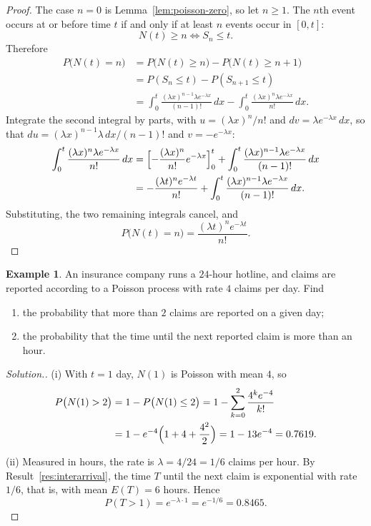 \documentclass[11pt,a4paper]{article}
\theoremstyle{definition}
\newtheorem{exa}[thm]{Example}
\newenvironment{solution}
  {\renewcommand{\qedsymbol}{}\begin{proof}[\textit{Solution}.]}
  {\end{proof}}
\begin{document}
\begin{proof}
The case $n = 0$ is Lemma~\ref{lem:poisson-zero}, so let $n \ge 1$. The $n$th event occurs at or before time $t$ if and only if at least $n$ events occur in
$[0, t]$:
\[
N(t) \ge n \iff S_n \le t .
\]
Therefore
\begin{align*}
P\bigl(N(t) = n\bigr) &= P\bigl(N(t) \ge n\bigr) - P\bigl(N(t) \ge n + 1\bigr) \\
&= P(S_n \le t) - P(S_{n+1} \le t) \\
&= \int_0^t\frac{(\lambda x)^{n-1}\lambda e^{-\lambda x}}{(n - 1)!}\,dx - \int_0^t\frac{(\lambda x)^n\lambda e^{-\lambda x}}{n!}\,dx .
\end{align*}
Integrate the second integral by parts, with $u = (\lambda x)^n/n!$ and $dv = \lambda e^{-\lambda x}\,dx$, so that $du = (\lambda x)^{n-1}\lambda\,dx/(n - 1)!$ and $v = -e^{-\lambda x}$:
\begin{align*}
\int_0^t\frac{(\lambda x)^n\lambda e^{-\lambda x}}{n!}\,dx &= \Bigl[-\frac{(\lambda x)^n}{n!}e^{-\lambda x}\Bigr]_0^t + \int_0^t\frac{(\lambda x)^{n-1}\lambda e^{-\lambda x}}{(n - 1)!}\,dx \\
&= -\frac{(\lambda t)^ne^{-\lambda t}}{n!} + \int_0^t\frac{(\lambda x)^{n-1}\lambda e^{-\lambda x}}{(n - 1)!}\,dx .
\end{align*}
Substituting, the two remaining integrals cancel, and
\[
P\bigl(N(t) = n\bigr) = \frac{(\lambda t)^ne^{-\lambda t}}{n!} .
\]
\end{proof}

\begin{exa}
An insurance company runs a $24$-hour hotline, and claims are reported according to a Poisson process with rate $4$ claims per day. Find
\begin{enumerate}[label=(\roman*)]
\item the probability that more than $2$ claims are reported on a given day;
\item the probability that the time until the next reported claim is more than an hour.
\end{enumerate}
\end{exa}

\begin{solution}
(i) With $t = 1$ day, $N(1)$ is Poisson with mean $4$, so
\begin{align*}
P\bigl(N(1) > 2\bigr) &= 1 - P\bigl(N(1) \le 2\bigr) = 1 - \sum_{k=0}^2\frac{4^ke^{-4}}{k!} \\
&= 1 - e^{-4}\Bigl(1 + 4 + \frac{4^2}{2}\Bigr) = 1 - 13e^{-4} = 0.7619 .
\end{align*}

(ii) Measured in hours, the rate is $\lambda = 4/24 = 1/6$ claims per hour. By Result~\ref{res:interarrival}, the time $T$ until the next claim is exponential
with rate $1/6$, that is, with mean $E(T) = 6$ hours. Hence
\[
P(T > 1) = e^{-\lambda \cdot 1} = e^{-1/6} = 0.8465 .
\]
\end{solution}
\end{document}
